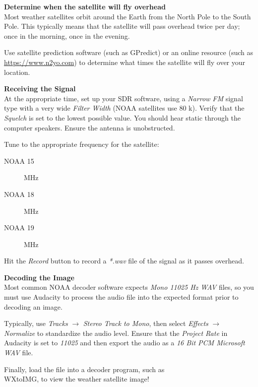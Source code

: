 \documentclass[10pt,foldmark,notumble]{leaflet}
\begin{document}
\textbf{Determine when the satellite will fly overhead}\\
Most weather satellites orbit around the Earth from the North Pole to the South
Pole. This typically means that the satellite will pass overhead twice
per day; once in the morning, once in the evening.

Use satellite prediction software (such as GPredict) or an online
resource (such as \url{https://www.n2yo.com}) to determine what times
the satellite will fly over your location.

\textbf{Receiving the Signal}\\
At the appropriate time, set up your SDR software,
using a \emph{Narrow FM} signal type with a very wide \emph{Filter Width}
(NOAA satellites use 80 k).
Verify that the \emph{Squelch} is set to the lowest possible value. You should
hear static through the computer speakers. Ensure the antenna is unobstructed.

Tune to the appropriate frequency for the satellite:
\begin{description}
\item[NOAA 15]  MHz
\item[NOAA 18]  MHz
\item[NOAA 19]  MHz
\end{description}

Hit the \emph{Record} button to record a \emph{*.wav} file
of the signal as it passes overhead.

\textbf{Decoding the Image}\\
Most common NOAA decoder software expects \emph{Mono 11025 Hz WAV} files, so you
must use Audacity to process the audio file into the expected format prior to
decoding an image.

Typically, use \emph{Tracks} $\to$ \emph{Stereo Track to Mono}, then
select \emph{Effects} $\to$ \emph{Normalize} to standardize the audio level.
Ensure that the \emph{Project Rate} in Audacity is set to \emph{11025} and then
export the audio as a \emph{16 Bit PCM Microsoft WAV} file.

Finally, load the file into a decoder program, such as\\ WXtoIMG, to view the
weather satellite image!
\end{document}
